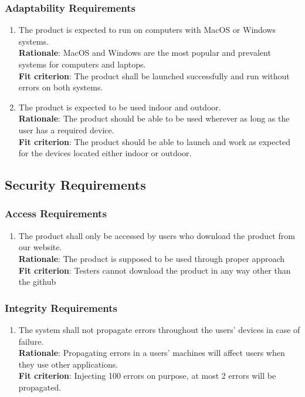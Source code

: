 \documentclass{article}
\begin{document}
\subsubsection{Adaptability Requirements}
\begin{enumerate}[MS3.1]
    \item The product is expected to run on computers with MacOS or Windows systems.\\
    \textbf{Rationale}: MacOS and Windows are the most popular and prevalent systems for computers and laptops.\\
    \textbf{Fit criterion}: The product shall be launched successfully and run without errors on both systems.\\
    \item The product is expected to be used indoor and outdoor.\\
    \textbf{Rationale}: The product should be able to be used wherever as long as the user has a required device.\\
    \textbf{Fit criterion}: The product should be able to launch and work as expected for the devices located either indoor or outdoor. \\
\end{enumerate}
\subsection{Security Requirements}
\subsubsection{Access Requirements}
\begin{enumerate}[SR1.1]
    \item The product shall only be accessed by users who download the product from our website.\\
    \textbf{Rationale}: The product is supposed to be used through proper approach\\
    \textbf{Fit criterion}: Testers cannot download the product in any way other than the github\\
\end{enumerate}
\subsubsection{Integrity Requirements}
\begin{enumerate}[SR2.1]
    \item The system shall not propagate errors throughout the users' devices in case of failure.\\
    \textbf{Rationale}: Propagating errors in a users' machines will affect
    users when they use other applications.\\
    \textbf{Fit criterion}: Injecting 100 errors on purpose, at most 2 errors
    will be propagated.\\
\end{enumerate}
\end{document}
